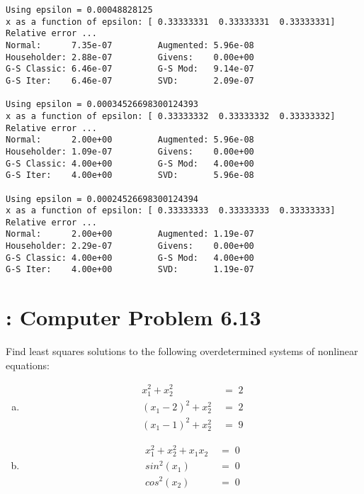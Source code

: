 \documentclass[paper=a4, fontsize=11pt]{scrartcl}
\numberwithin{equation}{section}		%
\numberwithin{figure}{section}			%
\numberwithin{table}{section}				%
\begin{document}
\begin{verbatim}
Using epsilon = 0.00048828125
x as a function of epsilon: [ 0.33333331  0.33333331  0.33333331]
Relative error ...
Normal:      7.35e-07         Augmented: 5.96e-08
Householder: 2.88e-07         Givens:    0.00e+00
G-S Classic: 6.46e-07         G-S Mod:   9.14e-07
G-S Iter:    6.46e-07         SVD:       2.09e-07

Using epsilon = 0.00034526698300124393
x as a function of epsilon: [ 0.33333332  0.33333332  0.33333332]
Relative error ...
Normal:      2.00e+00         Augmented: 5.96e-08
Householder: 1.09e-07         Givens:    0.00e+00
G-S Classic: 4.00e+00         G-S Mod:   4.00e+00
G-S Iter:    4.00e+00         SVD:       5.96e-08

Using epsilon = 0.00024526698300124394
x as a function of epsilon: [ 0.33333333  0.33333333  0.33333333]
Relative error ...
Normal:      2.00e+00         Augmented: 1.19e-07
Householder: 2.29e-07         Givens:    0.00e+00
G-S Classic: 4.00e+00         G-S Mod:   4.00e+00
G-S Iter:    4.00e+00         SVD:       1.19e-07
\end{verbatim}


\pagebreak
\section{: Computer Problem 6.13}
Find least squares solutions to the following overdetermined systems of nonlinear equations:
\begin{enumerate}[(a)]
	\item \begin{align*}
		x_1^2 + x_2^2 \; &= \; 2 \\
		(x_1 - 2)^2 + x_2^2 \; &= \; 2 \\
		(x_1 - 1)^2 + x_2^2 \; &= \; 9
	\end{align*}
	\item \begin{align*}
		x_1^2 + x_2^2 + x_1 x_2 \; &= \; 0 \\
		sin^2(x_1) \; &= \; 0 \\
		cos^2(x_2) \; &= \; 0
	\end{align*}
\end{enumerate}

\vspace{4mm}
\end{document}
